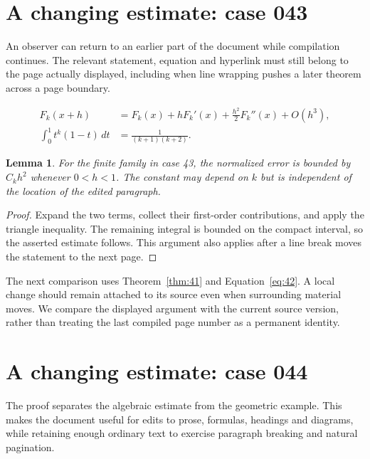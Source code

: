 \documentclass[a4paper,10pt]{article}
\newtheorem{lemma}[theorem]{Lemma}
\begin{document}
\lipsum[8]

\section{A changing estimate: case 043}\label{unit:42}
An observer can return to an earlier part of the document while compilation continues. The relevant statement, equation and hyperlink must still belong to the page actually displayed, including when line wrapping pushes a later theorem across a page boundary.

\lipsum[7-8]
\begin{align}\label{eq:42}
 F_k(x+h)&=F_k(x)+hF_k'(x)+\frac{h^2}{2}F_k''(x)+O(h^3),\\
 \int_0^1 t^k(1-t)\,dt&=\frac{1}{(k+1)(k+2)}.
\end{align}
\begin{lemma}\label{thm:42}
For the finite family in case 43, the normalized error is bounded by $C_k h^2$ whenever $0<h<1$. The constant may depend on $k$ but is independent of the location of the edited paragraph.
\end{lemma}
\begin{proof}
Expand the two terms, collect their first-order contributions, and apply the
triangle inequality. The remaining integral is bounded on the compact interval,
so the asserted estimate follows. This argument also applies after a line break
moves the statement to the next page.
\end{proof}
The next comparison uses Theorem~\ref{thm:41} and Equation~\ref{eq:42}. A local change should remain attached to its source even when surrounding material moves. We compare the displayed argument with the current source version, rather than treating the last compiled page number as a permanent identity.

\lipsum[13]

\section{A changing estimate: case 044}\label{unit:43}
The proof separates the algebraic estimate from the geometric example. This makes the document useful for edits to prose, formulas, headings and diagrams, while retaining enough ordinary text to exercise paragraph breaking and natural pagination.
\end{document}

